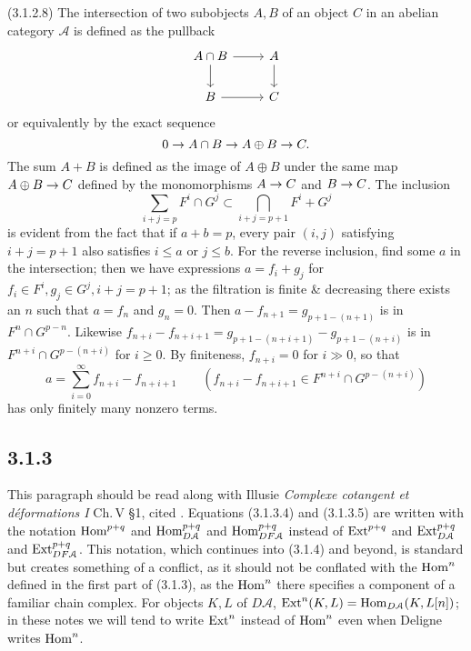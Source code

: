 \documentclass[deligne.tex]{subfiles}
\begin{document}
(3.1.2.8) The intersection of two subobjects $A,B$ of an object $C$ in an
abelian category $\mathcal A$ is defined as the pullback
\begin{equation*}\begin{tikzcd}
	A\cap B\arrow[d]\arrow[r]&A\arrow[d] \\
	B\arrow[r]&C
\end{tikzcd}\end{equation*}
or equivalently by the exact sequence
\begin{equation*}
	0\rightarrow A\cap B\rightarrow A\oplus B\rightarrow C.
\end{equation*}
The sum $A+B$ is defined as the image of $A\oplus B$ under the same map
$A\oplus B\rightarrow C$ defined by the monomorphisms $A\rightarrow C$ and $B\rightarrow C$.
The inclusion
\begin{equation*}
	\sum_{i+j=p}F^i\cap G^j\subset\bigcap_{i+j=p+1}F^i+G^j
\end{equation*}
is evident from the fact that if $a+b=p$, every pair $(i,j)$ satisfying
$i+j=p+1$ also satisfies $i\leq a$ or $j\leq b$.
For the reverse inclusion, find some $a$ in the intersection; then we
have expressions $a=f_i+g_j$ for $f_i\in F^i, g_j\in G^j,i+j=p+1$; as the 
filtration is finite \& decreasing there exists an $n$ such that
$a=f_n$ and $g_n=0$.
Then $a-f_{n+1}=g_{p+1-(n+1)}$ is in $F^n\cap G^{p-n}$.
Likewise $f_{n+i}-f_{n+i+1}=g_{p+1-(n+i+1)}-g_{p+1-(n+i)}$ is in
$F^{n+i}\cap G^{p-(n+i)}$ for $i\geq0$.
By finiteness, $f_{n+i}=0$ for $i\gg0$, so that
\begin{equation*}
	a=\sum_{i=0}^{\infty} f_{n+i}-f_{n+i+1}\qquad
	(f_{n+i}-f_{n+i+1}\in F^{n+i}\cap G^{p-(n+i)})
\end{equation*}
has only finitely many nonzero terms.

\subsection*{3.1.3} This paragraph should be read along with
Illusie \emph{Complexe cotangent et déformations I} Ch.\,V \S1, cited
\cite{Cotangent}. Equations (3.1.3.4) and (3.1.3.5) are written with the
notation
$\operatorname{Hom}^{p+q}$ and $\operatorname{Hom}_{D\mathcal A}^{p+q}$ and $\operatorname{Hom}_{DF\mathcal A}^{p+q}$ 
instead of
$\operatorname{Ext}^{p+q}$ and $\operatorname{Ext}_{D\mathcal A}^{p+q}$ and $\operatorname{Ext}_{DF\mathcal A}^{p+q}$.
This notation, which continues into (3.1.4) and beyond, is standard but
creates something of a conflict, as it should not be conflated with the
$\operatorname{Hom}^n$ defined in the first part of (3.1.3), as the $\operatorname{Hom}^n$ there
specifies a component of a familiar chain complex. For objects $K,L$ of
$D\mathcal A$, $\operatorname{Ext}^n(K,L)=\operatorname{Hom}_{D\mathcal A}(K,L[n])$; in these notes we
will tend to write $\operatorname{Ext}^n$ instead of $\operatorname{Hom}^n$ even when Deligne writes
$\operatorname{Hom}^n$.
\end{document}
